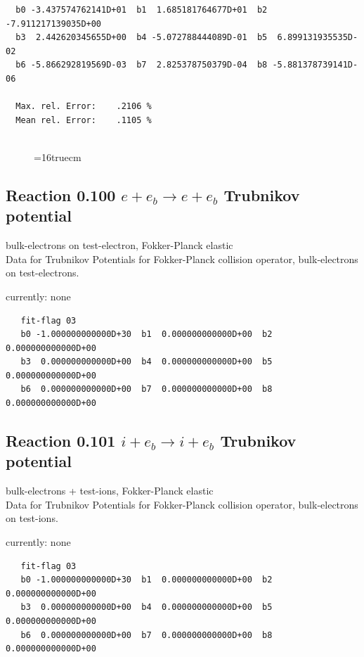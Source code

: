 \documentclass[12pt,dvipdfmx]{article}
\begin{document}
\begin{small}\begin{verbatim}
  b0 -3.437574762141D+01  b1  1.685181764677D+01  b2 -7.911217139035D+00
  b3  2.442620345655D+00  b4 -5.072788444089D-01  b5  6.899131935535D-02
  b6 -5.866292819569D-03  b7  2.825378750379D-04  b8 -5.881378739141D-06

  Max. rel. Error:    .2106 %
  Mean rel. Error:    .1105 %


\end{verbatim}\end{small}


\begin{figure} \label{2.26B}
\epsfxsize=16truecm
\end{figure}

\newpage

\subsection{
Reaction 0.100 $ e + e_b \rightarrow e + e_b$ Trubnikov potential}
bulk-electrons on test-electron, Fokker-Planck elastic \\
Data for Trubnikov Potentials for Fokker-Planck collision
operator, bulk-electrons on test-electrons.

currently: none


\begin{small}\begin{verbatim}
   fit-flag 03
   b0 -1.000000000000D+30  b1  0.000000000000D+00  b2  0.000000000000D+00
   b3  0.000000000000D+00  b4  0.000000000000D+00  b5  0.000000000000D+00
   b6  0.000000000000D+00  b7  0.000000000000D+00  b8  0.000000000000D+00
\end{verbatim}\end{small}

\subsection{
Reaction 0.101  $ i + e_b \rightarrow i + e_b$ Trubnikov potential}
bulk-electrons + test-ions, Fokker-Planck elastic \\
Data for Trubnikov Potentials for Fokker-Planck collision
operator, bulk-electrons on test-ions.

currently: none


\begin{small}\begin{verbatim}
   fit-flag 03
   b0 -1.000000000000D+30  b1  0.000000000000D+00  b2  0.000000000000D+00
   b3  0.000000000000D+00  b4  0.000000000000D+00  b5  0.000000000000D+00
   b6  0.000000000000D+00  b7  0.000000000000D+00  b8  0.000000000000D+00
\end{verbatim}\end{small}
\end{document}
